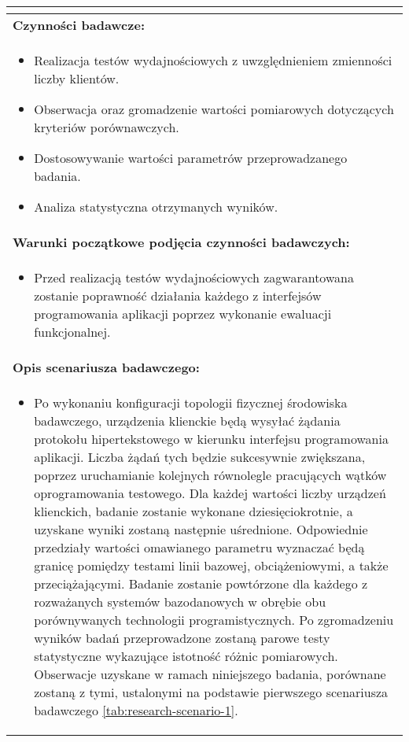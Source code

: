 \begin{longtable}[c]{|llll|}
{\begin{itemize}
        \end{itemize}}                                                           \\ \hline
    \multicolumn{4}{|l|}{\textbf{Czynności badawcze:}}                               \\ \hline
    \multicolumn{4}{|p{\linewidth}|}{
        \begin{itemize}
            \item Realizacja testów wydajnościowych z uwzględnieniem zmienności liczby klientów.
            \item Obserwacja oraz gromadzenie wartości pomiarowych dotyczących kryteriów porównawczych.
            \item Dostosowywanie wartości parametrów przeprowadzanego badania.
            \item Analiza statystyczna otrzymanych wyników.
        \end{itemize}
    }                                                           \\ \hline
    \multicolumn{4}{|l|}{\textbf{Warunki początkowe podjęcia czynności badawczych:}} \\ \hline
    \multicolumn{4}{|p{\linewidth}|}{
        \begin{itemize}[label={}]
            \item Przed realizacją testów wydajnościowych zagwarantowana zostanie poprawność działania każdego z interfejsów programowania aplikacji poprzez wykonanie ewaluacji funkcjonalnej.
          \end{itemize}
    }                                                           \\ \hline
    \multicolumn{4}{|l|}{\textbf{Opis scenariusza badawczego:}}                      \\ \hline
    \multicolumn{4}{|p{\linewidth}|}{
        \begin{itemize}[label={}]
            \item Po wykonaniu konfiguracji topologii fizycznej środowiska badawczego, urządzenia klienckie będą wysyłać żądania protokołu hipertekstowego w kierunku interfejsu programowania aplikacji. Liczba żądań tych będzie sukcesywnie zwiększana, poprzez uruchamianie kolejnych równolegle pracujących wątków oprogramowania testowego. Dla każdej wartości liczby urządzeń klienckich, badanie zostanie wykonane dziesięciokrotnie, a uzyskane wyniki zostaną następnie uśrednione. Odpowiednie przedziały wartości omawianego parametru wyznaczać będą granicę pomiędzy testami linii bazowej, obciążeniowymi, a także przeciążającymi. Badanie zostanie powtórzone dla każdego z rozważanych systemów bazodanowych w obrębie obu porównywanych technologii programistycznych. Po zgromadzeniu wyników badań przeprowadzone zostaną parowe testy statystyczne wykazujące istotność różnic pomiarowych. Obserwacje uzyskane w ramach niniejszego badania, porównane zostaną z tymi, ustalonymi na podstawie pierwszego scenariusza badawczego \ref{tab:research-scenario-1}.

\end{itemize}}
\end{longtable}
